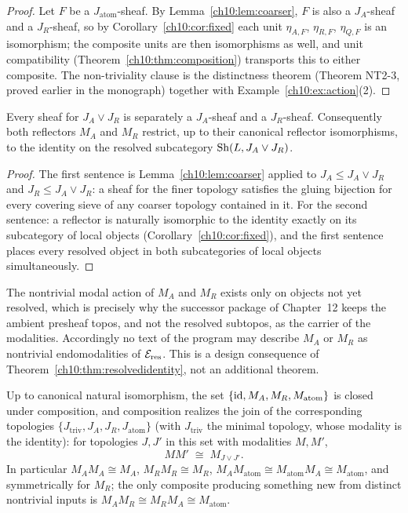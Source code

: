 \begin{proof}
Let $F$ be a $J_{\mathrm{atom}}$-sheaf. By Lemma~\ref{ch10:lem:coarser}, $F$
is also a $J_A$-sheaf and a $J_R$-sheaf, so by
Corollary~\ref{ch10:cor:fixed} each unit $\eta_{A, F}$, $\eta_{R, F}$,
$\eta_{Q, F}$ is an isomorphism; the composite units are then isomorphisms as
well, and unit compatibility (Theorem~\ref{ch10:thm:composition}) transports
this to either composite. The non-triviality clause is the distinctness
theorem (Theorem NT2-3, proved earlier in the monograph) together with
Example~\ref{ch10:ex:action}(2).
\end{proof}

\begin{theorem}
\label{ch10:thm:resolvedidentity}
Every sheaf for $J_A \vee J_R$ is separately a $J_A$-sheaf and a
$J_R$-sheaf. Consequently both reflectors $M_A$ and $M_R$ restrict, up to
their canonical reflector isomorphisms, to the identity on the resolved
subcategory $\mathrm{Sh}(L, J_A \vee J_R)$.
\end{theorem}

\begin{proof}
The first sentence is Lemma~\ref{ch10:lem:coarser} applied to
$J_A \le J_A \vee J_R$ and $J_R \le J_A \vee J_R$: a sheaf for the finer
topology satisfies the gluing bijection for every covering sieve of any
coarser topology contained in it. For the second sentence: a reflector is
naturally isomorphic to the identity exactly on its subcategory of local
objects (Corollary~\ref{ch10:cor:fixed}), and the first sentence places every
resolved object in both subcategories of local objects simultaneously.
\end{proof}

\begin{designargument}
The nontrivial modal action of $M_A$ and $M_R$ exists only on objects not yet
resolved, which is precisely why the successor package of Chapter~12 keeps the
ambient presheaf topos, and not the resolved subtopos, as the carrier of the
modalities. Accordingly no text of the program may describe $M_A$ or $M_R$ as
nontrivial endomodalities of $\mathcal{E}_{\mathrm{res}}$. This is a design consequence of
Theorem~\ref{ch10:thm:resolvedidentity}, not an additional theorem.
\end{designargument}

\begin{proposition}
\label{ch10:prop:algebra}
Up to canonical natural isomorphism, the set
$\{\mathrm{id}, M_A, M_R, M_{\mathrm{atom}}\}$ is closed under composition, and
composition realizes the join of the corresponding topologies
$\{J_{\mathrm{triv}}, J_A, J_R, J_{\mathrm{atom}}\}$ (with
$J_{\mathrm{triv}}$ the minimal topology, whose modality is the
identity): for topologies $J, J'$ in this set with modalities $M, M'$,
\[
M M' \;\cong\; M_{J \vee J'} .
\]
In particular $M_A M_A \cong M_A$, $M_R M_R \cong M_R$,
$M_A M_{\mathrm{atom}} \cong M_{\mathrm{atom}} M_A \cong
M_{\mathrm{atom}}$, and symmetrically for $M_R$; the only composite
producing something new from distinct nontrivial inputs is
$M_A M_R \cong M_R M_A \cong M_{\mathrm{atom}}$.
\end{proposition}

